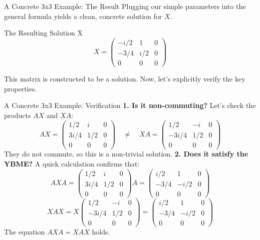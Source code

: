\documentclass{beamer}
\begin{document}
\begin{frame}{A Concrete 3x3 Example: The Result}
  Plugging our simple parameters into the general formula yields a clean, concrete solution for $X$.
  \begin{block}{The Resulting Solution X}
  \[ X = \begin{pmatrix} -i/2 & 1 & 0 \\ -3/4 & i/2 & 0 \\ 0 & 0 & 0 \end{pmatrix} \]
  \end{block}
  This matrix is constructed to be a solution. Now, let's explicitly verify the key properties.
\end{frame}

\begin{frame}{A Concrete 3x3 Example: Verification}
  \textbf{1. Is it non-commuting?} Let's check the products $AX$ and $XA$:
    \[ AX = \begin{pmatrix} 1/2 & i & 0 \\ 3i/4 & 1/2 & 0 \\ 0 & 0 & 0 \end{pmatrix} \quad \neq \quad XA = \begin{pmatrix} 1/2 & -i & 0 \\ -3i/4 & 1/2 & 0 \\ 0 & 0 & 0 \end{pmatrix} \]
    They do not commute, so this is a non-trivial solution.
    \vfill
  \textbf{2. Does it satisfy the YBME?}
    A quick calculation confirms that:
    \[ AXA = \begin{pmatrix} 1/2 & i & 0 \\ 3i/4 & 1/2 & 0 \\ 0 & 0 & 0 \end{pmatrix} A = \begin{pmatrix} i/2 & 1 & 0 \\ -3/4 & -i/2 & 0 \\ 0 & 0 & 0 \end{pmatrix} \]
    \[ XAX = X \begin{pmatrix} 1/2 & -i & 0 \\ -3i/4 & 1/2 & 0 \\ 0 & 0 & 0 \end{pmatrix} = \begin{pmatrix} i/2 & 1 & 0 \\ -3/4 & -i/2 & 0 \\ 0 & 0 & 0 \end{pmatrix} \]
    The equation $AXA=XAX$ holds.
\end{frame}
\end{document}
